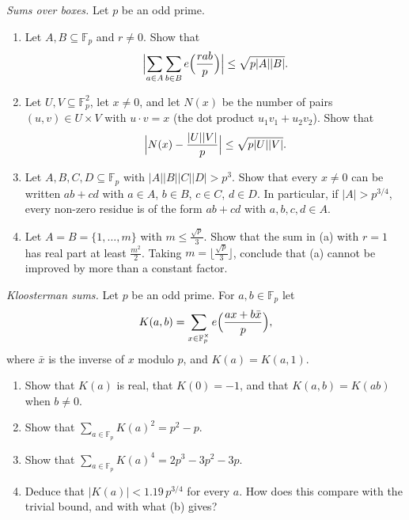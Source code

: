 \begin{exercise}[$\star\star$]\label{pb:bilinear}
\emph{Sums over boxes.} Let $p$ be an odd prime.
\begin{enumerate}[label=(\alph*)]
\item Let $A,B\subseteq\mathbb F_p$ and $r\ne0$. Show that
\[
\Bigl|\sum_{a\in A}\sum_{b\in B}e\Bigl(\frac{rab}p\Bigr)\Bigr|\le\sqrt{p|A||B|}.
\]
\item Let $U,V\subseteq\mathbb F_p^2$, let $x\ne0$, and let $N(x)$ be the number of pairs $(u,v)\in U\times V$ with $u\cdot v=x$ (the dot
product $u_1v_1+u_2v_2$). Show that
\[
\Bigl|N(x)-\frac{|U||V|}p\Bigr|\le\sqrt{p|U||V|}.
\]
\item Let $A,B,C,D\subseteq\mathbb F_p$ with $|A||B||C||D|>p^3$. Show that every $x\ne0$ can be written $ab+cd$ with $a\in A$, $b\in B$,
$c\in C$, $d\in D$. In particular, if $|A|>p^{3/4}$, every non-zero residue is of the form $ab+cd$ with $a,b,c,d\in A$.
\item Let $A=B=\{1,\dots,m\}$ with $m\le\frac{\sqrt p}3$. Show that the sum in (a) with $r=1$ has real part at least $\frac{m^2}2$. Taking
$m=\lfloor\frac{\sqrt p}3\rfloor$, conclude that (a) cannot be improved by more than a constant factor.
\end{enumerate}
\end{exercise}

\begin{exercise}[$\star\star\star$]\label{pb:kloosterman}
\emph{Kloosterman sums.} Let $p$ be an odd prime. For $a,b\in\mathbb F_p$ let
\[
K(a,b)=\sum_{x\in\mathbb F_p^\times}e\Bigl(\frac{ax+b\bar x}p\Bigr),
\]
where $\bar x$ is the inverse of $x$ modulo $p$, and $K(a)=K(a,1)$.
\begin{enumerate}[label=(\alph*)]
\item Show that $K(a)$ is real, that $K(0)=-1$, and that $K(a,b)=K(ab)$ when $b\ne0$.
\item Show that $\sum_{a\in\mathbb F_p}K(a)^2=p^2-p$.
\item Show that $\sum_{a\in\mathbb F_p}K(a)^4=2p^3-3p^2-3p$.
\item Deduce that $|K(a)|<1.19\,p^{3/4}$ for every $a$. How does this compare with the trivial bound, and with what (b) gives?
\end{enumerate}
\end{exercise}

